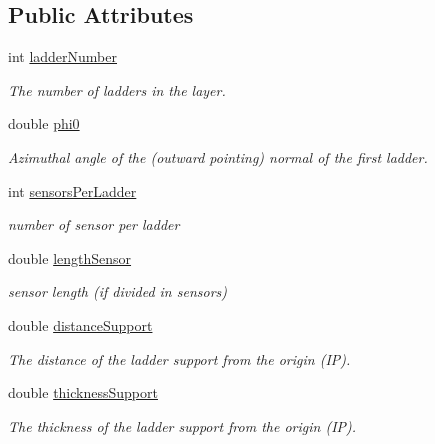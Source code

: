 \subsection*{Public Attributes}
\begin{DoxyCompactItemize}
\item 
int \hyperlink{struct_d_d4hep_1_1_d_d_rec_1_1_z_planar_struct_1_1_layer_layout_ae351fc83c681934cc2bd3b9032224392}{ladder\+Number}
\begin{DoxyCompactList}\small\item\em The number of ladders in the layer. \end{DoxyCompactList}\item 
double \hyperlink{struct_d_d4hep_1_1_d_d_rec_1_1_z_planar_struct_1_1_layer_layout_ab8c82da52f15d64226f8ef416194f97a}{phi0}
\begin{DoxyCompactList}\small\item\em Azimuthal angle of the (outward pointing) normal of the first ladder. \end{DoxyCompactList}\item 
int \hyperlink{struct_d_d4hep_1_1_d_d_rec_1_1_z_planar_struct_1_1_layer_layout_a8dae7b7f1795d92d7edca6571933ee00}{sensors\+Per\+Ladder}
\begin{DoxyCompactList}\small\item\em number of sensor per ladder \end{DoxyCompactList}\item 
double \hyperlink{struct_d_d4hep_1_1_d_d_rec_1_1_z_planar_struct_1_1_layer_layout_a9ad59213381cec4c5f5bfb7c8a5e8763}{length\+Sensor}
\begin{DoxyCompactList}\small\item\em sensor length (if divided in sensors) \end{DoxyCompactList}\item 
double \hyperlink{struct_d_d4hep_1_1_d_d_rec_1_1_z_planar_struct_1_1_layer_layout_ad8dd683017ec90bd4663b66fce126208}{distance\+Support}
\begin{DoxyCompactList}\small\item\em The distance of the ladder support from the origin (IP). \end{DoxyCompactList}\item 
double \hyperlink{struct_d_d4hep_1_1_d_d_rec_1_1_z_planar_struct_1_1_layer_layout_ad5631fa2c5ffb8e75433a14045b4db90}{thickness\+Support}
\begin{DoxyCompactList}\small\item\em The thickness of the ladder support from the origin (IP). \end{DoxyCompactList}\item 

\end{DoxyCompactItemize}
